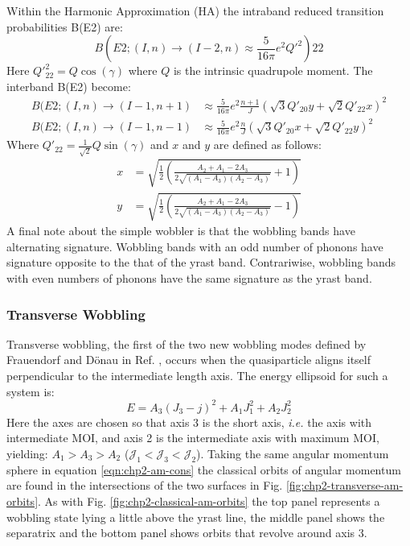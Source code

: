 Within the Harmonic Approximation (HA) the intraband reduced transition probabilities B(E2) \cite{wobblingGeometry} are:
\begin{equation}
\label{eqn:chp2-simple-wobb-intraband-e2-red-mat}
B(E2;(I,n)\rightarrow(I-2,n)\approx\frac{5}{16\pi}e^2Q'^2){22}
\end{equation}
Here $Q'^2_{22}=Q\cos(\gamma)$ where $Q$ is the intrinsic quadrupole moment. The interband B(E2) \cite{wobblingGeometry} become:
\begin{align}
\label{eqn:chp2-simple-wobb-interband-e2-red-mat}
B(E2;(I,n)\rightarrow(I-1,n+1)&\approx\frac{5}{16\pi}e^2\frac{n+1}{J}\left(\sqrt{3}Q'_{20}y+\sqrt{2}Q'_{22}x\right)^2\\
B(E2;(I,n)\rightarrow(I-1,n-1)&\approx\frac{5}{16\pi}e^2\frac{n}{J}\left(\sqrt{3}Q'_{20}x+\sqrt{2}Q'_{22}y\right)^2
\end{align}
Where $Q'_{22}=\frac{1}{\sqrt{2}}Q\sin(\gamma)$ and $x$ and $y$ are defined as follows:
\begin{align}
\label{eqn:chp2-simple-wobb-x-y-params}
x&=\sqrt{\frac{1}{2}\left(\frac{A_2+A_1-2A_3}{2\sqrt{(A_1-A_3)(A_2-A_3)}}+1\right)}\\
y&=\sqrt{\frac{1}{2}\left(\frac{A_2+A_1-2A_3}{2\sqrt{(A_1-A_3)(A_2-A_3)}}-1\right)}\nonumber
\end{align}
A final note about the simple wobbler is that the wobbling bands have alternating signature. Wobbling bands with an odd number of phonons have signature opposite to the that of the yrast band. Contrariwise, wobbling bands with even numbers of phonons have the same signature as the yrast band.

\subsubsection{Transverse Wobbling}
\label{sssec:models-wobbling-transverse-wobbling}
Transverse wobbling, the first of the two new wobbling modes defined by Frauendorf and D\"onau in Ref. \cite{frauendorfTransverseWobbling}, occurs when the quasiparticle aligns itself perpendicular to the intermediate length axis. The energy ellipsoid for such a system is:
\begin{equation}
\label{eqn:chp2-transverse-en-ellipsoid}
E=A_3(J_3-j)^2 + A_1J_1^2 + A_2J_2^2
\end{equation}
Here the axes are chosen so that axis 3 is the short axis, \emph{i.e.} the axis with intermediate MOI, and axis 2 is the intermediate axis with maximum MOI, yielding: $A_1>A_3>A_2$ ($\mathcal{J}_1<\mathcal{J}_3<\mathcal{J}_2$). Taking the same angular momentum sphere in equation \ref{eqn:chp2-am-cons} the classical orbits of angular momentum are found in the intersections of the two surfaces in Fig. \ref{fig:chp2-transverse-am-orbits}. As with Fig. \ref{fig:chp2-classical-am-orbits} the top panel represents a wobbling state lying a little above the yrast line, the middle panel shows the separatrix and the bottom panel shows orbits that revolve around axis 3.


